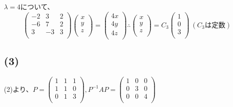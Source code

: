 \documentclass[]{jsarticle}
\begin{document}
        $\lambda = 4$について、
            \begin{equation*}
                \begin{pmatrix}
                    -2 & 3 & 2 \\
                    -6 & 7 & 2 \\
                    3 & -3 & 3 \\
                \end{pmatrix}
                \begin{pmatrix}
                    x \\
                    y \\
                    z \\
                \end{pmatrix} =
                \begin{pmatrix}
                    4x \\
                    4y \\
                    4z \\
                \end{pmatrix}
                \therefore
                \begin{pmatrix}
                    x \\
                    y \\
                    z \\
                \end{pmatrix} =
                C_3\begin{pmatrix}
                    1 \\
                    0 \\
                    3 \\
                \end{pmatrix} \
                (C_3は定数)
            \end{equation*}
    \subsection*{(3)}
        (2)より、$
            P = \begin{pmatrix}
                1 & 1 & 1 \\
                1 & 1 & 0 \\
                0 & 1 & 3 \\
            \end{pmatrix}, P^{-1}AP = \begin{pmatrix}
                1 & 0 & 0 \\
                0 & 3 & 0 \\
                0 & 0 & 4 \\
            \end{pmatrix}
        $
\end{document}
